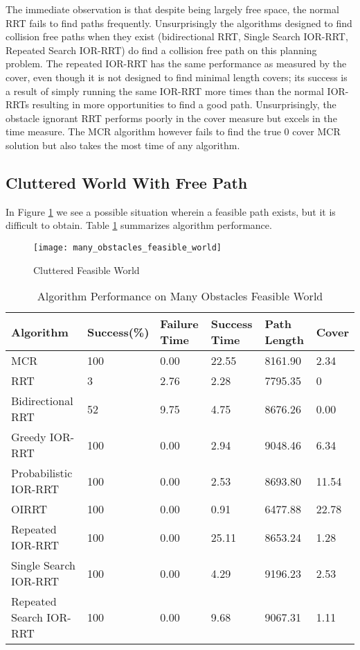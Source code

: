 The immediate observation is that despite being largely free space, the normal RRT fails to find paths frequently. Unsurprisingly the algorithms designed to find collision free paths when they exist (bidirectional RRT, Single Search IOR-RRT, Repeated Search IOR-RRT) do find a collision free path on this planning problem. The repeated IOR-RRT has the same performance as measured by the cover, even though it is not designed to find minimal length covers; its success is a result of simply running the same IOR-RRT more times than the normal IOR-RRTs resulting in more opportunities to find a good path. Unsurprisingly, the obstacle ignorant RRT performs poorly in the cover measure but excels in the time measure. The MCR algorithm however fails to find the true 0 cover MCR solution but also takes the most time of any algorithm.

\subsection{Cluttered World With Free Path}
In Figure \ref{fig:many_obstacles_feasible_world} we see a possible situation wherein a feasible path exists, but it is difficult to obtain. Table \ref{tab:many_obstacles_feasible_world} summarizes algorithm performance.

\begin{figure}[h!]
    \centering
    \texttt{[image: many\_obstacles\_feasible\_world]}
    \caption{Cluttered Feasible World}
    \label{fig:many_obstacles_feasible_world}
\end{figure}


\begin{table}[h!]
\begin{tabular}{@{}llllll@{}}
\toprule
Algorithm & Success(\%)  & Failure Time  & Success Time  & Path Length & Cover\\ 
\midrule
MCR & 100 & 0.00 & 22.55 & 8161.90 & 2.34 \\
RRT & 3 & 2.76 & 2.28 & 7795.35 & 0 \\
Bidirectional RRT & 52 & 9.75 & 4.75 & 8676.26 & 0.00 \\
Greedy IOR-RRT & 100 & 0.00 & 2.94 & 9048.46 & 6.34 \\
Probabilistic IOR-RRT & 100 & 0.00 & 2.53 & 8693.80 & 11.54 \\
OIRRT & 100 & 0.00 & 0.91 & 6477.88 & 22.78 \\
Repeated IOR-RRT & 100 & 0.00 & 25.11 & 8653.24 & 1.28 \\
Single Search IOR-RRT & 100 & 0.00 & 4.29 & 9196.23 & 2.53 \\
Repeated Search IOR-RRT & 100 & 0.00 & 9.68 & 9067.31 & 1.11 \\
\bottomrule
\end{tabular}
\caption{Algorithm Performance on Many Obstacles Feasible World}
\label{tab:many_obstacles_feasible_world}
\end{table}


